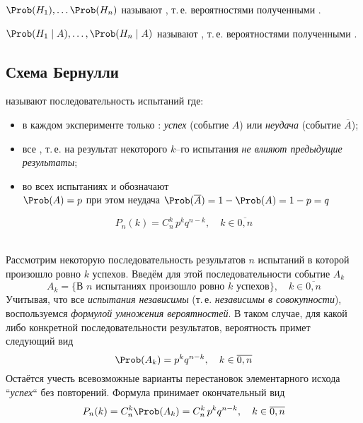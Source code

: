 \begin{rem}
	 $\Prob(H_1), \dots \Prob(H_n)$ называют , т.\,е. вероятностями полученными .
\end{rem}

\begin{rem}
	 $\Prob(H_1 \mid A), \dots, \Prob(H_n \mid A)$ называют , т.\,е. вероятностями полученными .
\end{rem}



\subsection{Схема Бернулли}

\begin{definition}
	 называют последовательность испытаний где:
	\begin{itemize}
		\item в каждом эксперименте только : \textit{успех} (событие $A$) или \textit{неудача} (событие $\overline{A}$);
		\item все , т.\,е. на результат некоторого $k$--го испытания \textit{не влияют предыдущие результаты};
		\item {} во всех испытаниях  и обозначают \\ $\Prob(A) = p$ при этом неудача $\Prob(\overline{A}) = 1 - \Prob(A) = 1 - p = q$
	\end{itemize}
\end{definition}

\begin{theorem}
	\[
		P_n(k) = C_n^k\,p^k q^{n-k}, \quad k \in \overline{0, n}
	\]
\end{theorem}

\begin{Proof}\\\hangindent=1cm
	Рассмотрим некоторую последовательность результатов $n$ испытаний в которой произошло ровно $k$ успехов. Введём для этой последовательности событие $A_k$
	\[
		A_k = \{ \text{В $n$ испытаниях произошло ровно $k$ успехов} \}, \quad k \in \overline{0, n}
	\] 
	Учитывая, что все \textit{испытания независимы} (т.\,е. \textit{независимы в совокупности}), воспользуемся \textit{формулой умножения вероятностей}. В таком случае, для какой либо конкретной последовательности результатов, вероятность примет следующий вид
	\[
		\Prob(A_k) = p^k q^{n-k}, \quad k \in \overline{0, n}
	\]
	Остаётся учесть всевозможные варианты перестановок элементарного исхода ``\textit{успех}`` без повторений. Формула принимает окончательный вид
	\[
	  	P_n(k) = C_n^k\Prob(A_k) = C_n^k\,p^k q^{n-k}, \quad k \in \overline{0, n}
	\]
\end{Proof}

